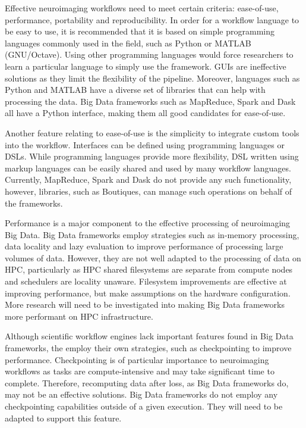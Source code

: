         Effective neuroimaging workflows need to meet certain criteria:
        ease-of-use, performance, portability and reproducibility. In order 
        for a workflow language to be easy to
        use, it is recommended that it is based on simple programming languages
        commonly used in the field, such as Python or MATLAB (GNU/Octave). Using
        other programming languages would force researchers to learn a
        particular language to simply use the framework. GUIs are ineffective
        solutions as they limit the flexibility of the pipeline. Moreover,
        languages such as Python and MATLAB have a diverse set of libraries that
        can help with processing the data. Big Data frameworks such as
        MapReduce, Spark and Dask all have a Python interface, making them all
        good candidates for ease-of-use.


        Another feature relating to ease-of-use is the simplicity to integrate
        custom tools into the workflow. Interfaces can be defined using
        programming languages or DSLs. While programming languages provide more
        flexibility, DSL written using markup languages can be easily shared and
        used by many workflow languages. Currently, MapReduce, Spark and Dask do
        not provide any such functionality, however, libraries, such as
        Boutiques, can manage such operations on behalf of the frameworks.


        Performance is a major component to the effective processing of
        neuroimaging Big Data. Big Data frameworks employ strategies such as
        in-memory processing, data locality and lazy evaluation to improve
        performance of processing large volumes of data. However, they are not
        well adapted to the processing of data on HPC, particularly as HPC
        shared filesystems are separate from compute nodes and schedulers are
        locality unaware. Filesystem improvements are effective at improving
        performance, but make assumptions on the hardware configuration. More
        research will need to be investigated into making Big Data frameworks
        more performant on HPC infrastructure.

        Although scientific workflow engines lack important features found in
        Big Data frameworks, the employ their own strategies, such as
        checkpointing to improve performance. Checkpointing is of particular
        importance to neuroimaging workflows as tasks are compute-intensive and
        may take significant time to complete. Therefore, recomputing data after
        loss, as Big Data frameworks do, may not be an effective solutions. Big
        Data frameworks do not employ any checkpointing capabilities outside of
        a given execution. They will need to be adapted to support this feature.


